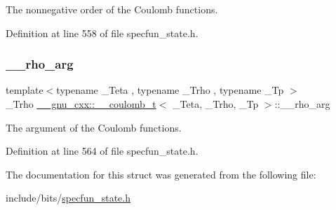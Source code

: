 The nonnegative order of the Coulomb functions. 



Definition at line 558 of file specfun\+\_\+state.\+h.

\mbox{\label{struct____gnu__cxx_1_1____coulomb__t_ae279212b8d75f82d050394be1744600c}} 
\subsubsection{\texorpdfstring{\+\_\+\+\_\+rho\+\_\+arg}{\_\_rho\_arg}}
{\footnotesize\ttfamily template$<$typename \+\_\+\+Teta , typename \+\_\+\+Trho , typename \+\_\+\+Tp $>$ \\
\+\_\+\+Trho \hyperlink{struct____gnu__cxx_1_1____coulomb__t}{\+\_\+\+\_\+gnu\+\_\+cxx\+::\+\_\+\+\_\+coulomb\+\_\+t}$<$ \+\_\+\+Teta, \+\_\+\+Trho, \+\_\+\+Tp $>$\+::\+\_\+\+\_\+rho\+\_\+arg}



The argument of the Coulomb functions. 



Definition at line 564 of file specfun\+\_\+state.\+h.



The documentation for this struct was generated from the following file\+:\begin{DoxyCompactItemize}
\item 
include/bits/\hyperlink{specfun__state_8h}{specfun\+\_\+state.\+h}\end{DoxyCompactItemize}
